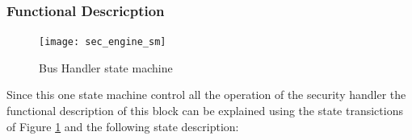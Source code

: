 \subsubsection{Functional Descricption}

\begin{figure}[!ht]
	\centering
	\texttt{[image: sec\_engine\_sm]}
    \caption{Bus Handler state machine  }
	\label{fig:phsm}
\end{figure}
Since this one state machine control all the operation of the security handler the functional 
description of this block can be explained using the state transictions of Figure \ref{fig:phsm} and the 
following state description:

